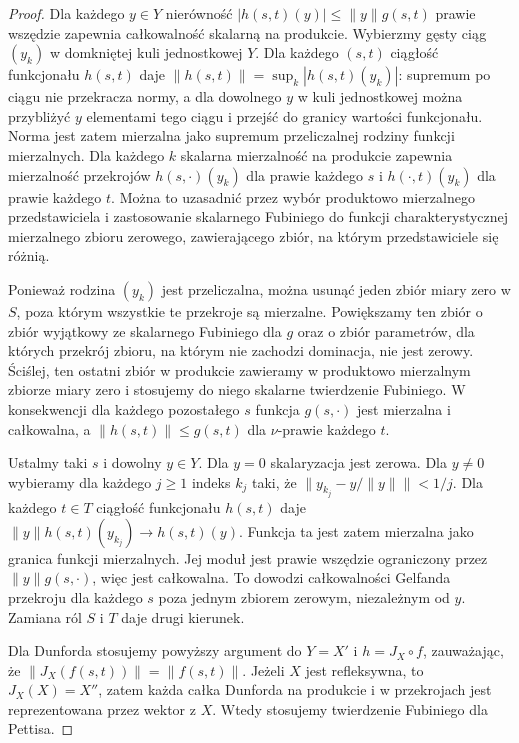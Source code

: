 \begin{proof}
Dla każdego $y\in Y$ nierówność
$|h(s,t)(y)|\le\|y\|g(s,t)$ prawie wszędzie zapewnia
całkowalność skalarną na produkcie. Wybierzmy gęsty
ciąg $(y_k)$ w domkniętej kuli jednostkowej $Y$.
Dla każdego $(s,t)$ ciągłość funkcjonału $h(s,t)$ daje
$\|h(s,t)\|=\sup_k|h(s,t)(y_k)|$: supremum po ciągu
nie przekracza normy, a dla dowolnego $y$ w kuli jednostkowej
można przybliżyć $y$ elementami tego ciągu i przejść do
granicy wartości funkcjonału. Norma jest zatem mierzalna
jako supremum przeliczalnej rodziny funkcji mierzalnych. Dla każdego $k$ skalarna
mierzalność na produkcie zapewnia mierzalność
przekrojów $h(s,\cdot)(y_k)$ dla prawie każdego $s$
i $h(\cdot,t)(y_k)$ dla prawie każdego $t$.
Można to uzasadnić przez wybór produktowo mierzalnego
przedstawiciela i zastosowanie skalarnego Fubiniego
do funkcji charakterystycznej mierzalnego zbioru
zerowego, zawierającego zbiór, na którym przedstawiciele
się różnią.

Ponieważ rodzina $(y_k)$ jest przeliczalna, można
usunąć jeden zbiór miary zero w $S$, poza którym
wszystkie te przekroje są mierzalne. Powiększamy
ten zbiór o zbiór wyjątkowy ze skalarnego Fubiniego
dla $g$ oraz o zbiór parametrów, dla których przekrój
zbioru, na którym nie zachodzi dominacja, nie jest
zerowy. Ściślej, ten ostatni zbiór w produkcie
zawieramy w produktowo mierzalnym zbiorze miary zero
i stosujemy do niego skalarne twierdzenie Fubiniego.
W konsekwencji dla każdego pozostałego $s$ funkcja
$g(s,\cdot)$ jest mierzalna i całkowalna, a
$\|h(s,t)\|\le g(s,t)$ dla $\nu$-prawie każdego $t$.

Ustalmy taki $s$ i dowolny $y\in Y$. Dla $y=0$
skalaryzacja jest zerowa. Dla $y\ne0$ wybieramy
dla każdego $j\ge1$ indeks $k_j$ taki, że
$\|y_{k_j}-y/\|y\|\|<1/j$.
Dla każdego $t\in T$ ciągłość funkcjonału $h(s,t)$
daje $\|y\|h(s,t)(y_{k_j})\to h(s,t)(y)$.
Funkcja ta jest zatem mierzalna jako granica funkcji
mierzalnych. Jej moduł jest prawie wszędzie ograniczony
przez $\|y\|g(s,\cdot)$, więc jest całkowalna.
To dowodzi całkowalności Gelfanda przekroju dla każdego
$s$ poza jednym zbiorem zerowym, niezależnym od $y$.
Zamiana ról $S$ i $T$ daje drugi kierunek.

Dla Dunforda stosujemy powyższy argument do
$Y=X'$ i $h=J_X\circ f$, zauważając, że
$\|J_X(f(s,t))\|=\|f(s,t)\|$. Jeżeli $X$ jest
refleksywna, to $J_X(X)=X''$, zatem każda całka
Dunforda na produkcie i w przekrojach jest reprezentowana
przez wektor z $X$. Wtedy stosujemy twierdzenie
Fubiniego dla Pettisa.
\end{proof}

